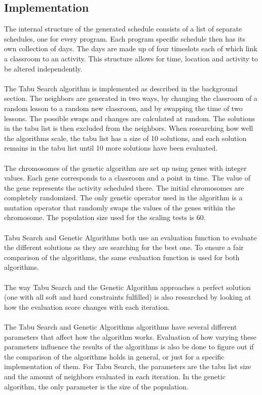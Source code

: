 \documentclass[titlepage,a4paper]{article}
\begin{document}
\subsection{Implementation}
The internal structure of the generated schedule consists of a list of separate schedules, one for every program. Each program specific schedule then has its own collection of days. The days are made up of four timeslots each of which link a classroom to an activity. This structure allows for time, location and activity to be altered independently. \\\\
The Tabu Search algorithm is implemented as described in the background section. The neighbors are generated in two ways, by changing the classroom of a random lesson to a random new classroom, and by swapping the time of two lessons. The possible swaps and changes are calculated at random. The solutions in the tabu list is then excluded from the neighbors. When researching how well the algorithms scale, the tabu list has a size of 10 solutions, and each solution remains in the tabu list until 10 more solutions have been evaluated. \\\\
The chromosomes of the genetic algorithm are set up using genes with integer values. Each gene corresponds to a classroom and a point in time. The value of the gene represents the activity scheduled there. The initial chromosomes are completely randomized. The only genetic operator used in the algorithm is a mutation operator that randomly swaps the values of the genes within the chromosome. The population size used for the scaling tests is 60. \\\\
Tabu Search and Genetic Algorithms both use an evaluation function to evaluate the different solutions as they are searching for the best one. To ensure a fair comparison of the algorithms, the same evaluation function is used for both algorithms. \\\\
The way Tabu Search and the Genetic Algorithm approaches a perfect solution (one with all soft and hard constraints fulfilled) is also researched by looking at how the evaluation score changes with each iteration. \\\\
The Tabu Search and Genetic Algorithms algorithms have several different parameters that affect how the algorithm works. Evaluation of how varying these parameters influence the results of the algorithms is also be done to figure out if the comparison of the algorithms holds in general, or just for a specific implementation of them.
For Tabu Search, the parameters are the tabu list size and the amount of neighbors evaluated in each iteration. 
In the genetic algorithm, the only parameter is the size of the population.
\end{document}
